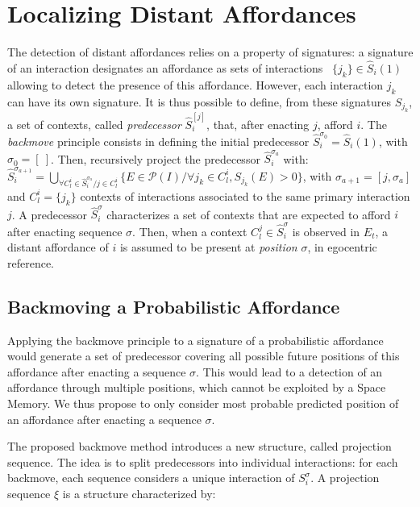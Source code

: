 \documentclass[conference]{IEEEtran}
\begin{document}
\section{Localizing Distant Affordances}\label{localize}


The detection of distant affordances relies on a property of signatures: a signature of an interaction designates an affordance as sets of interactions ~$\{j_k\} \in \hat{S}_i(1)$ allowing to detect the presence of this affordance.
However, each interaction $j_k$ can have its own signature. It is thus possible to define, from these signatures $S_{j_k}$, a set of contexts, called \textit{predecessor} $\hat{S}_i^{[j]}$, that, after enacting $j$, afford $i$. The \textit{backmove} principle consists in defining the initial predecessor $\hat{S}_i^{\sigma_0}=\hat{S}_i(1)$, with $\sigma_0=[~]$. Then, recursively project the predecessor $\hat{S}_i^{\sigma_a}$ with:
$\hat{S}_i^{\sigma_{a+1}}\!=\!\bigcup_{\forall C_l^i \in \hat{S}_i^{\sigma_a} / j \in C_l^i} \{E \in \mathcal{P}(I) / \forall j_k \in C_l^i, S_{j_k}(E)\!>\!0\}$,
with $\sigma_{a+1}=[j,\sigma_a]$ and $C_l^i=\{j_k\}$ contexts of interactions associated to the same primary interaction $j$.
A predecessor $\hat{S}_i^\sigma$ characterizes a set of contexts that are expected to afford $i$ after enacting sequence $\sigma$.
Then, when a context $C_l^j \in \hat{S}_i^\sigma$ is observed in $E_t$, a distant affordance of $i$ is assumed to be present at \textit{position} $\sigma$, in egocentric reference.


\subsection{Backmoving a Probabilistic Affordance}\label{backmove}

Applying the backmove principle to a signature of a probabilistic affordance would generate a set of predecessor covering all possible future positions of this affordance after enacting a sequence $\sigma$. This would lead to a detection of an affordance through multiple positions, which cannot be exploited by a Space Memory.
We thus propose to only consider most probable predicted position of an affordance after enacting a sequence $\sigma$.

The proposed backmove method introduces a new structure, called projection sequence. The idea is to split predecessors into individual interactions: for each backmove, each sequence considers a unique interaction of $S_i^{\sigma}$.
A projection sequence $\xi$ is a structure characterized by:
\end{document}
